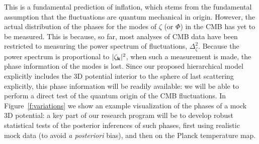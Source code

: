\documentclass[psfig,12pt]{article}
\def\be{\begin{equation}}
\def\ee{\end{equation}}
\begin{document}
{This is a
fundamental prediction of inflation, which stems from the fundamental assumption that
the fluctuations are quantum mechanical in origin.
However, the actual distribution of the phases for the modes of $\zeta$
(or $\Phi$) in the CMB has yet to be measured. This is because, so far,
most analyses of CMB data have been restricted to measuring
the power spectrum of
fluctuations, $\Delta_\zeta^2$.
Because the power spectrum is proportional to $ |\zeta_{{\bf k}}|^2$,
when such a measurement is made, the phase information of the modes is
lost.
Since our proposed hierarchical model explicitly
includes the 3D potential interior to the sphere of last scattering
explicitly,
this phase information will
be readily available:
we will be able to perform a direct test of the quantum
origin of the CMB fluctuations. In Figure~\ref{f:variations} we
show an example visualization of the phases of a mock 3D potential:
a key part of our research program will be to develop
robust statistical
tests of the posterior inferences of such phases, first using realistic
mock data (to avoid {\it a posteriori} bias),
and then on the Planck temperature map.

}
\end{document}
